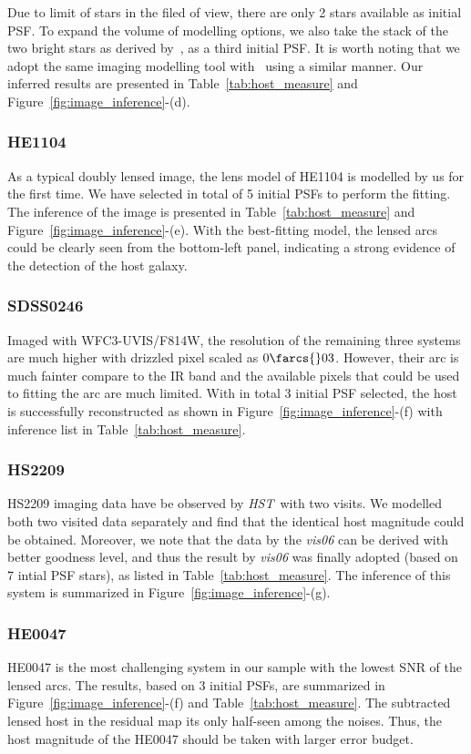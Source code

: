 \documentclass[fleqn,usenatbib]{mnras}
\newcommand{\hst}{{\it HST}}
\begin{document}
Due to limit of stars in the filed of view, there are only 2 stars available as initial PSF. To expand the volume of modelling options, we also take the stack of the two bright stars as derived by~\citet{Birrer2019}, as a third initial PSF. It is worth noting that we adopt the same imaging modelling tool with~\citet{Birrer2019} using a similar manner. Our inferred results are presented in Table~\ref{tab:host_measure} and Figure~\ref{fig:image_inference}-(d).


\subsubsection{HE1104}
As a typical doubly lensed image, the lens model of HE1104 is modelled by us for the first time. We have selected in total of 5 initial PSFs to perform the fitting. The inference of the image is presented in Table~\ref{tab:host_measure} and Figure~\ref{fig:image_inference}-(e).  With the best-fitting model, the lensed arcs could be clearly seen from the bottom-left panel, indicating a strong evidence of the detection of the host galaxy.

\subsubsection{SDSS0246}
Imaged with WFC3-UVIS/F814W, the resolution of the remaining three systems are much higher with drizzled pixel scaled as $0\farcs{}03$. However, their arc is much fainter compare to the IR band and the available pixels that could be used to fitting the arc are much limited. With in total 3 initial PSF selected, the host is successfully reconstructed as shown in Figure~\ref{fig:image_inference}-(f) with inference list in Table~\ref{tab:host_measure}. 

\subsubsection{HS2209}
HS2209 imaging data have be observed by \hst\ with two visits. We modelled both two visited data separately and find that the identical host magnitude could be obtained. Moreover, we note that the data by the {\it vis06} can be derived with better goodness level, and thus the result by {\it vis06} was finally adopted (based on 7 intial PSF stars), as listed in Table~\ref{tab:host_measure}. The inference of this system is summarized in Figure~\ref{fig:image_inference}-(g).

\subsubsection{HE0047}
HE0047 is the most challenging system in our sample with the lowest SNR of the lensed arcs. The results, based on 3 initial PSFs, are summarized in Figure~\ref{fig:image_inference}-(f) and Table~\ref{tab:host_measure}. The subtracted lensed host in the residual map its only half-seen among the noises. Thus, the host magnitude of the HE0047 should be taken with larger error budget.
\end{document}
